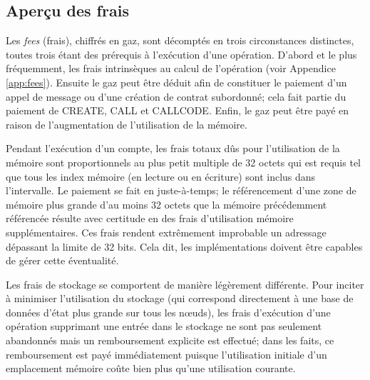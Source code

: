 \documentclass[9pt,oneside]{amsart}
\begin{document}
\begin{multicols}{2}
\subsection{Aperçu des frais}

Les \textit{fees} (frais), chiffrés en gaz, sont décomptés en trois circonstances distinctes, toutes trois étant des prérequis à l'exécution d'une opération. D'abord et le plus fréquemment, les frais intrinsèques au calcul de l'opération (voir Appendice \ref{app:fees}). Ensuite le gaz peut être déduit afin de constituer le paiement d'un appel de message ou d'une création de contrat subordonné; cela fait partie du paiement de {\small CREATE}, {\small CALL} et {\small CALLCODE}. Enfin, le gaz peut être payé en raison de l'augmentation de l'utilisation de la mémoire.

Pendant l'exécution d'un compte,
les frais totaux dûs pour l'utilisation de la mémoire sont proportionnels au plus petit multiple de 32 octets qui est requis tel que tous les index mémoire (en lecture ou en écriture) sont inclus dans l'intervalle. Le paiement se fait en juste-à-temps; le référencement d'une zone de mémoire plus grande d'au moins 32 octets que la mémoire précédemment référencée résulte avec certitude en des frais d'utilisation mémoire supplémentaires. Ces frais rendent extrêmement improbable un adressage dépassant la limite de 32 bits. Cela dit, les implémentations doivent être capables de gérer cette éventualité.

Les frais de stockage se comportent de manière légèrement différente. Pour inciter à minimiser l'utilisation du stockage (qui correspond directement à une base de données d'état plus grande sur tous les n\oe{}uds), les frais d'exécution d'une opération supprimant une entrée dans le stockage ne sont pas seulement abandonnés mais un remboursement explicite est effectué; dans les faits, ce remboursement est payé immédiatement puisque l'utilisation initiale d'un emplacement mémoire coûte bien plus qu'une utilisation courante.


\end{multicols}
\end{document}
